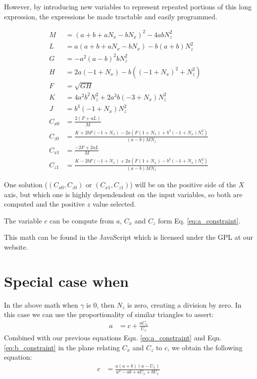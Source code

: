 \documentclass{article}
\begin{document}
However, by introducing new variables to represent repeated
portions of this long expression, the expressions be
made tractable and easily programmed.

\begin{align}
M &= (a + b + a N_x - b N_x)^2 - 4 a b N_z^2 \\
L &= a (a + b + a N_x - b N_x) - b (a + b) N_z^2 \\
G &= -a^2 (a - b)^2 b N_z^2 \\
H &= 2 a (-1 + N_x) - b ((-1 + N_x)^2 + N_z^2) \\
F &= \sqrt{G H} \\
K &= 4 a^2 b^2 N_z^2 + 2 a^3 b (-3 + N_x) N_z^2 \\
J &= b^3 (-1 + N_x) N_z^2 \\
C_{x0} &= \frac{2 (F + a L)}{M} \\
C_{z0} &= \frac{K + 2 b F (-1 + N_x) -
  2 a (F (1 + N_x) + b^3 (-1 + N_x) N_z^2)}
{(a -  b) M N_z} \\
C_{x1} &= \frac{-2 F + 2 a L}{M} \\
  C_{z1} &= \frac{K - 2 b F (-1 + N_x) +
    2 a (F (1 + N_x) - b^3 (-1 + N_x) N_z^2)}
  {(a - b) M N_z}
\end{align}

One solution ($(C_{x0},C_{z0})$ or $(C_{x1},C_{z1})$) will be on the
positive side of the $X$ axis, but which one is highly dependendent
on the input variables, so both are computed and the positive $z$
value selected.

The variable $c$ can be compute from $a$, $C_x$ and $C_z$
form Eq. \ref{eq:a_constraint}.

This math can be found in the JavaScript which is licensed
under the GPL\cite{gplv3} at our website\cite{softrobotcalc}.

\section{Special case when }

In the above math when $\gamma$ is $0$, then $N_z$ is zero,
creating a division by zero.
In this case we can use the proportionality of similar
triangles to assert:
\begin{align}
  a &= c + \frac{a C_x}{U_x}
\end{align}
Combined with our previous equations
Eqn. \ref{eq:a_constraint} and Eqn. \ref{eq:b_constraint} in the plane
relating $C_x$ and $C_z$ to $c$,
we obtain the following equation:
\begin{align}
c & = \frac{a (a + b) (a - U_x)}{a^2 - a b + a U_x + b U_x}
\end{align}
\end{document}
